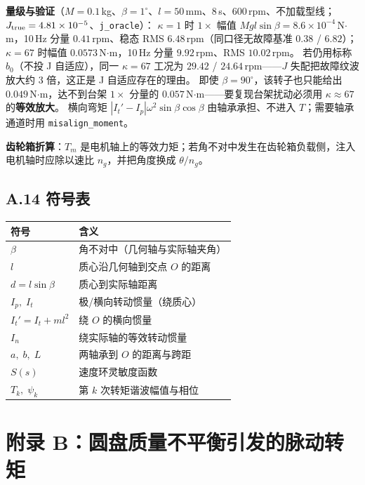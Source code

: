 \documentclass[11pt,a4paper]{article}
\theoremstyle{remark}\newtheorem{remark}{注}
\begin{document}
\textbf{量级与验证}（$M=0.1$\,kg、$\beta=1^\circ$、$l=50$\,mm、$8$\,s、$600$\,rpm、不加载型线；$J_{\rm true}=4.81\times10^{-5}$、\texttt{j\_oracle}）：
$\kappa=1$ 时 $1\times$ 幅值 $Mgl\sin\beta=8.6\times10^{-4}$\,N$\cdot$m，10\,Hz 分量 $0.41$\,rpm、稳态 RMS $6.48$\,rpm（同口径无故障基准 $0.38$ / $6.82$）；
$\kappa=67$ 时幅值 $0.0573$\,N$\cdot$m，10\,Hz 分量 $9.92$\,rpm、RMS $10.02$\,rpm。
若仍用标称 $b_0$（不投 J 自适应），同一 $\kappa=67$ 工况为 $29.42$ / $24.64$\,rpm——$J$ 失配把故障纹波放大约 $3$ 倍，这正是 J 自适应存在的理由。
即使 $\beta=90^\circ$，该转子也只能给出 $0.049$\,N$\cdot$m，达不到台架 $1\times$ 分量的 $0.057$\,N$\cdot$m——要复现台架扰动必须用 $\kappa\approx67$ 的\textbf{等效放大}。
横向弯矩 $|I_t'-I_p|\omega^2\sin\beta\cos\beta$ 由轴承承担、不进入 $T$；需要轴承通道时用 \texttt{misalign\_moment}。



\textbf{齿轮箱折算}：$T_m$ 是电机轴上的等效力矩；若角不对中发生在齿轮箱负载侧，注入电机轴时应除以速比 $n_g$，并把角度换成 $\theta/n_g$。

\subsection*{A.14 符号表}

\begin{center}\footnotesize
\begin{tabular}{@{}ll@{}}
\toprule
符号 & 含义\\
\midrule
$\beta$ & 角不对中（几何轴与实际轴夹角）\\
$l$ & 质心沿几何轴到交点 $O$ 的距离\\
$d=l\sin\beta$ & 质心到实际轴距离\\
$I_p,\;I_t$ & 极/横向转动惯量（绕质心）\\
$I_t'=I_t+ml^2$ & 绕 $O$ 的横向惯量\\
$I_n$ & 绕实际轴的等效转动惯量\\
$a,\;b,\;L$ & 两轴承到 $O$ 的距离与跨距\\
$S(s)$ & 速度环灵敏度函数\\
$T_k,\;\psi_k$ & 第 $k$ 次转矩谐波幅值与相位\\
\bottomrule
\end{tabular}
\end{center}

\section*{附录 B：圆盘质量不平衡引发的脉动转矩}\label{app:unbalance}
\end{document}
